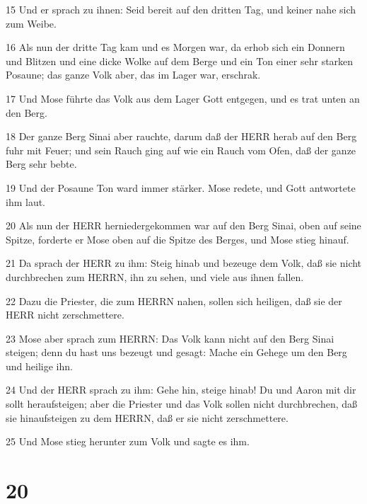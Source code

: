 \par 15 Und er sprach zu ihnen: Seid bereit auf den dritten Tag, und keiner nahe sich zum Weibe.
\par 16 Als nun der dritte Tag kam und es Morgen war, da erhob sich ein Donnern und Blitzen und eine dicke Wolke auf dem Berge und ein Ton einer sehr starken Posaune; das ganze Volk aber, das im Lager war, erschrak.
\par 17 Und Mose führte das Volk aus dem Lager Gott entgegen, und es trat unten an den Berg.
\par 18 Der ganze Berg Sinai aber rauchte, darum daß der HERR herab auf den Berg fuhr mit Feuer; und sein Rauch ging auf wie ein Rauch vom Ofen, daß der ganze Berg sehr bebte.
\par 19 Und der Posaune Ton ward immer stärker. Mose redete, und Gott antwortete ihm laut.
\par 20 Als nun der HERR herniedergekommen war auf den Berg Sinai, oben auf seine Spitze, forderte er Mose oben auf die Spitze des Berges, und Mose stieg hinauf.
\par 21 Da sprach der HERR zu ihm: Steig hinab und bezeuge dem Volk, daß sie nicht durchbrechen zum HERRN, ihn zu sehen, und viele aus ihnen fallen.
\par 22 Dazu die Priester, die zum HERRN nahen, sollen sich heiligen, daß sie der HERR nicht zerschmettere.
\par 23 Mose aber sprach zum HERRN: Das Volk kann nicht auf den Berg Sinai steigen; denn du hast uns bezeugt und gesagt: Mache ein Gehege um den Berg und heilige ihn.
\par 24 Und der HERR sprach zu ihm: Gehe hin, steige hinab! Du und Aaron mit dir sollt heraufsteigen; aber die Priester und das Volk sollen nicht durchbrechen, daß sie hinaufsteigen zu dem HERRN, daß er sie nicht zerschmettere.
\par 25 Und Mose stieg herunter zum Volk und sagte es ihm.

\chapter{20}

